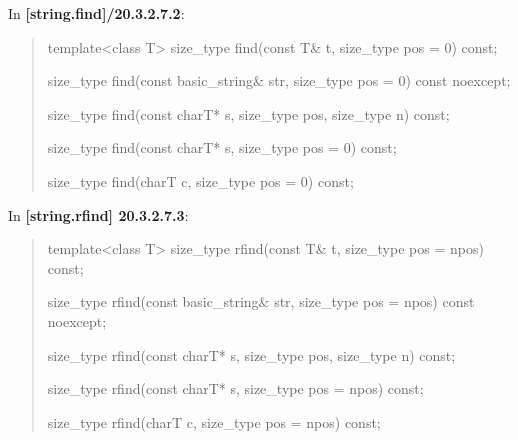 \documentclass{wg21}
\begin{document}
In \textbf{[string.find]/20.3.2.7.2}:
\begin{quote}
\begin{itemdecl}
template<class T>
  size_type find(const T& t, size_type pos = 0) const;
\end{itemdecl}

\begin{itemdecl}
size_type find(const basic_string& str, size_type pos = 0) const noexcept;
\end{itemdecl}

\begin{itemdecl}
size_type find(const charT* s, size_type pos, size_type n) const;
\end{itemdecl}

\begin{itemdecl}
size_type find(const charT* s, size_type pos = 0) const;
\end{itemdecl}

\begin{itemdecl}
size_type find(charT c, size_type pos = 0) const;
\end{itemdecl}
\end{quote}


In \textbf{[string.rfind] 20.3.2.7.3}:
\begin{quote}
\begin{itemdecl}
template<class T>
  size_type rfind(const T& t, size_type pos = npos) const;
\end{itemdecl}

\begin{itemdecl}
size_type rfind(const basic_string& str, size_type pos = npos) const noexcept;
\end{itemdecl}

\begin{itemdecl}
size_type rfind(const charT* s, size_type pos, size_type n) const;
\end{itemdecl}

\begin{itemdecl}
size_type rfind(const charT* s, size_type pos = npos) const;
\end{itemdecl}

\begin{itemdecl}
size_type rfind(charT c, size_type pos = npos) const;
\end{itemdecl}
\end{quote}
\end{document}
